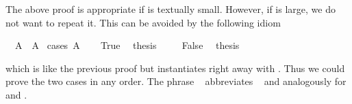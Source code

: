 \begin{isabellebody}
\begin{isamarkuptext}
The above proof is appropriate if  is textually small.
However, if  is large, we do not want to repeat it. This can
be avoided by the following idiom%
\end{isamarkuptext}%
\isamarkuptrue%
\isamarkupfalse%
\ {\isachardoublequoteopen}{\isasymnot}\ A\ {\isasymor}\ A{\isachardoublequoteclose}\isanewline
%
\isadelimproof
%
\endisadelimproof
%
\isatagproof
{}\isamarkupfalse%
\ {\isacharparenleft}cases\ {\isachardoublequoteopen}A{\isachardoublequoteclose}{\isacharparenright}\isanewline
\ \ \isamarkupfalse%
\ True\ \isamarkupfalse%
\ {\isacharquery}thesis\ \isacommand{{\isachardot}{\isachardot}}\isamarkupfalse%
\isanewline
{}\isamarkupfalse%
\isanewline
\ \ \isamarkupfalse%
\ False\ \isamarkupfalse%
\ {\isacharquery}thesis\ \isacommand{{\isachardot}{\isachardot}}\isamarkupfalse%
\isanewline
{}\isamarkupfalse%
%
\endisatagproof
{\isafoldproof}%
%
\isadelimproof
%
\endisadelimproof
%
\begin{isamarkuptext}%
\noindent which is like the previous proof but instantiates
 right away with . Thus we could prove the two
cases in any order. The phrase ~
abbreviates ~ and analogously for
 and .


\end{isamarkuptext}
\end{isabellebody}
